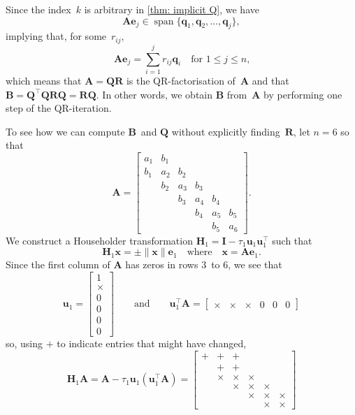 \documentclass[12pt,a4paper]{article}
\newcommand{\bs}[1]{\boldsymbol{#1}}
\newcommand{\vecspan}{\operatorname{span}}
\begin{document}
Since the index~$k$ is arbitrary in \cref{thm: implicit Q}, we have
\[
\bs{A}\bs{e}_j\in\vecspan\{\bs{q}_1,\bs{q}_2,\ldots,\bs{q}_j\},
\]
implying that, for some~$r_{ij}$,
\[
\bs{A}\bs{e}_j=\sum_{i=1}^jr_{ij}\bs{q}_i\quad\text{for $1\le j\le n$,}
\]
which means that $\bs{A}=\bs{Q}\bs{R}$ is the QR-factorisation of~$\bs{A}$ and
that $\bs{B}=\bs{Q}^\top\bs{Q}\bs{R}\bs{Q}=\bs{R}\bs{Q}$.  In other words, we
obtain $\bs{B}$ from~$\bs{A}$ by performing one step of the QR-iteration.

To see how we can compute $\bs{B}$~and $\bs{Q}$ without explicitly
finding~$\bs{R}$, let $n=6$ so that
\[
\boldsymbol{A}=\begin{bmatrix}
a_1&b_1&   &   &   &   \\
b_1&a_2&b_2&   &   &   \\
   &b_2&a_3&b_3&   &   \\
   &   &b_3&a_4&b_4&   \\
   &   &   &b_4&a_5&b_5\\
   &   &   &   &b_5&a_6\end{bmatrix}.
\]
We construct a Householder transformation
$\boldsymbol{H}_1=\boldsymbol{I}-\tau_1\boldsymbol{u}_1\boldsymbol{u}_1^\top$
such that
\[
\boldsymbol{H}_1\boldsymbol{x}=\pm\|\boldsymbol{x}\|\boldsymbol{e}_1
\quad\text{where}\quad\boldsymbol{x}
      =\boldsymbol{A}\boldsymbol{e}_1.
\]
Since the first column of $\boldsymbol{A}$ has zeros in rows $3$~to $6$, we see
that
\[
\boldsymbol{u}_1=\begin{bmatrix}1\\ \times\\ 0\\ 0\\ 0\\ 0\end{bmatrix}
\qquad\text{and}\qquad
\boldsymbol{u}_1^\top\boldsymbol{A}=\begin{bmatrix}
\times&\times&\times&0&0&0\end{bmatrix}
\]
so, using $+$ to indicate entries that might have changed,
\[
\boldsymbol{H}_1\boldsymbol{A}
=\boldsymbol{A}-\tau_1\boldsymbol{u}_1(\boldsymbol{u}_1^\top\boldsymbol{A})
      =\begin{bmatrix}
+&     +&     +&      &      &      \\
 &     +&     +&      &      &      \\
 &\times&\times&\times&      &      \\
 &      &\times&\times&\times&      \\
 &      &      &\times&\times&\times\\
 &      &      &      &\times&\times\end{bmatrix}
\]
\end{document}
